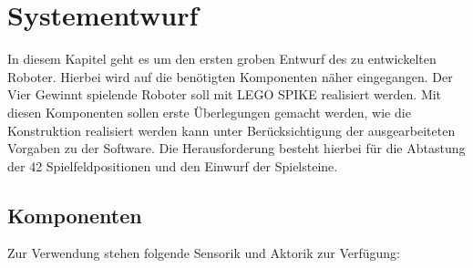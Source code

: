 \chapter{Systementwurf}
\label{cha:Systementwurf}
In diesem Kapitel geht es um den ersten groben Entwurf des zu entwickelten Roboter. Hierbei wird auf die benötigten Komponenten näher eingegangen. Der Vier Gewinnt spielende Roboter soll mit LEGO SPIKE realisiert werden. Mit diesen Komponenten sollen erste Überlegungen gemacht werden, wie die Konstruktion realisiert werden kann unter Berücksichtigung der ausgearbeiteten Vorgaben zu der Software. Die Herausforderung besteht hierbei für die Abtastung der 42 Spielfeldpositionen und den Einwurf der Spielsteine.



\section{Komponenten}
Zur Verwendung stehen folgende Sensorik und Aktorik zur Verfügung:


